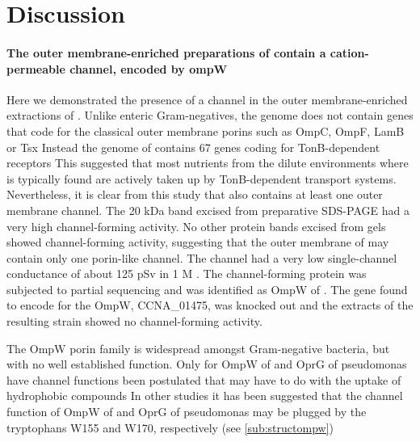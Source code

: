 \section{Discussion}
\label{sec:porin-discussion}

\paragraph{The outer membrane-enriched preparations of \caulobacter contain a cation-permeable channel, encoded by ompW}
Here we demonstrated the presence of a channel in the outer membrane-enriched extractions of \caulobacter. Unlike enteric Gram-negatives, the genome does not contain genes that code for the classical outer membrane porins such as OmpC, OmpF, LamB or Tsx Instead the genome of \caulobacter contains 67 genes coding for TonB-dependent receptors This suggested that most nutrients from the dilute environments where \caulobacter is typically found are actively taken up by TonB-dependent transport systems. Nevertheless, it is clear from this study that \caulobacter also contains at least one outer membrane channel. The 20 kDa band excised from preparative \ac{SDS-PAGE} had a very high channel-forming activity. No other protein bands excised from gels showed channel-forming activity, suggesting that the outer membrane of \caulobacter may contain only one porin-like channel. The channel had a very low single-channel conductance of about 125 \si{\pico\sievert} in 1 M . The channel-forming protein was subjected to partial sequencing and was identified as OmpW of \caulobacter. The gene found to encode for the OmpW, CCNA\_01475, was knocked out and the extracts of the resulting strain showed no channel-forming activity.

 The OmpW porin family is widespread amongst Gram-negative bacteria, but with no well established function. Only for OmpW of \ecoli and OprG of \ac{pseudomonas} have channel functions been postulated that may have to do with the uptake of hydrophobic compounds In other studies it has been suggested that the channel function of OmpW of \ecoli and OprG of \ac{pseudomonas} may be plugged by  the tryptophans W155 and W170, respectively (see \cref{sub:structompw}) 

